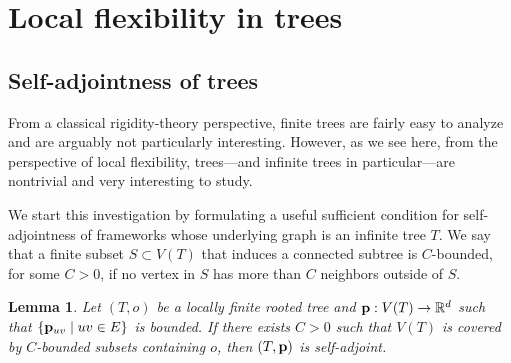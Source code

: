 \documentclass[10pt,a4paper]{amsart}
\numberwithin{equation}{section}
\newtheorem{lemma}[theorem]{Lemma}
\newcommand{\R}{\mathbb R}
\newcommand{\p}{{\bf p}}
\begin{document}
\section{Local flexibility in trees}\label{sec:trees}
\subsection{Self-adjointness of trees}
From a classical rigidity-theory perspective, finite trees are fairly easy to analyze and are arguably not particularly interesting. However, as we see here, from the perspective of local flexibility, trees---and infinite trees in particular---are nontrivial and very interesting to study. 

We start this investigation by formulating a useful sufficient condition for self-adjointness of frameworks whose underlying graph 
is an infinite tree $T$. We say that a finite subset $S\subset V(T)$ that induces a connected subtree is $C$-bounded, for some $C>0$, if no vertex in $S$ has more than $C$ neighbors outside of $S$.
\begin{lemma}\label{lem:tree_self_adjoint}
    Let $(T,o)$ be a locally finite rooted tree and $\p:V(T)\to\R^d$ such that $\{\p_{uv}\mid uv\in E\}$ is bounded. If there exists $C>0$ such that $V(T)$ is covered by $C$-bounded subsets containing $o$, then $(T,\p)$ is self-adjoint.
\end{lemma} 
\end{document}
